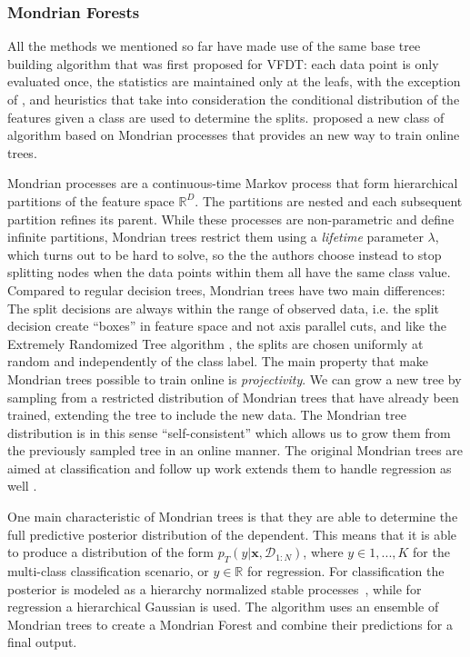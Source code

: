 
\subsubsection*{Mondrian Forests}

All the methods we mentioned so far have made use of the same base tree building
algorithm that was first proposed for VFDT: each data point is only evaluated once,
the statistics are maintained only at the leafs, with the exception of \cite{efdt},
and heuristics that take into consideration the conditional distribution of the
features given a class are used to determine the splits. \citet{mondrian-forests-original}
proposed a new class of algorithm based on Mondrian processes \cite{mondrian-process}
that provides an new way to train online trees.

Mondrian processes are a continuous-time
Markov process that form hierarchical partitions of the feature space $\mathbb{R}^D$.
The partitions are nested and each subsequent partition refines its parent. While
these processes are non-parametric and define infinite partitions, Mondrian trees
restrict them using a \emph{lifetime} parameter $\lambda$, which turns out to be hard to solve,
so the the authors choose instead to stop splitting nodes when the data points
within them all have the same class value. Compared to regular decision trees,
Mondrian trees have two main differences: The split decisions are always within
the range of observed data, i.e. the split decision create ``boxes'' in feature
space and not axis parallel cuts, and like the Extremely Randomized Tree algorithm
\cite{ert}, the splits are chosen uniformly at random and independently of the
class label. The main property that make Mondrian trees possible to train
online is \emph{projectivity}. We can grow a new tree by sampling from a restricted
distribution of Mondrian trees that have already been trained, extending the tree
to include the new data. The Mondrian tree distribution is in this sense ``self-consistent''
\cite{mondrian-forests-original} which allows us to grow them from the previously
sampled tree in an online manner. The original Mondrian trees are aimed at classification
and follow up work extends them to handle regression as well \cite{mondrian-forests-regression}.

One main characteristic of Mondrian trees is that they are able to determine the full
predictive posterior distribution of the dependent. This means that it is able to
produce a distribution of the form $p_T(y |\mathbf{x}, \mathcal{D}_{1:N})$, where
$y \in {1,..., K}$ for the multi-class classification scenario, or $y \in \mathbb{R}$
for regression. For classification the posterior is modeled as a hierarchy
normalized stable processes~\cite{nsp}, while for regression a hierarchical Gaussian is used.
The algorithm uses an ensemble of Mondrian trees to create a Mondrian Forest and combine
their predictions for a final output.

